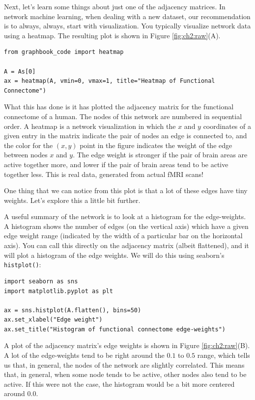 Next, let's learn some things about just one of the adjacency matrices. In network machine learning, when dealing with a new dataset, our recommendation is to {always}, {always}, start with visualization. You typically visualize network data using a heatmap. The resulting plot is shown in Figure \ref{fig:ch2:raw}(A).

\begin{lstlisting}[style=python]
from graphbook_code import heatmap

A = As[0]
ax = heatmap(A, vmin=0, vmax=1, title="Heatmap of Functional Connectome")
\end{lstlisting}

What this has done is it has plotted the adjacency matrix for the functional connectome of a human. The nodes of this network are numbered in sequential order. A heatmap is a network visualization in which the $x$ and $y$ coordinates of a given entry in the matrix indicate the pair of nodes an edge is connected to, and the color for the $(x,y)$ point in the figure indicates the weight of the edge between nodes $x$ and $y$. The edge weight is stronger if the pair of brain areas are active together more, and lower if the pair of brain areas tend to be active together less. This is real data, generated from actual fMRI scans!

One thing that we can notice from this plot is that a lot of these edges have tiny weights. Let's explore this a little bit further. 

A useful summary of the network is to look at a histogram for the edge-weights. A histogram shows the number of edges (on the vertical axis) which have a given edge weight range (indicated by the width of a particular bar on the horizontal axis). You can call this directly on the adjacency matrix (albeit flattened), and it will plot a histogram of the edge weights. We will do this using seaborn's \texttt{histplot()}:

\begin{lstlisting}[style=python]
import seaborn as sns
import matplotlib.pyplot as plt

ax = sns.histplot(A.flatten(), bins=50)
ax.set_xlabel("Edge weight")
ax.set_title("Histogram of functional connectome edge-weights")
\end{lstlisting}
A plot of the adjacency matrix's edge weights is shown in Figure \ref{fig:ch2:raw}(B). A lot of the edge-weights tend to be right around the $0.1$ to $0.5$ range, which tells us that, in general, the nodes of the network are {slightly correlated}. This means that, in general, when some node tends to be active, other nodes also tend to be active. If this were not the case, the histogram would be a bit more centered around $0.0$.

